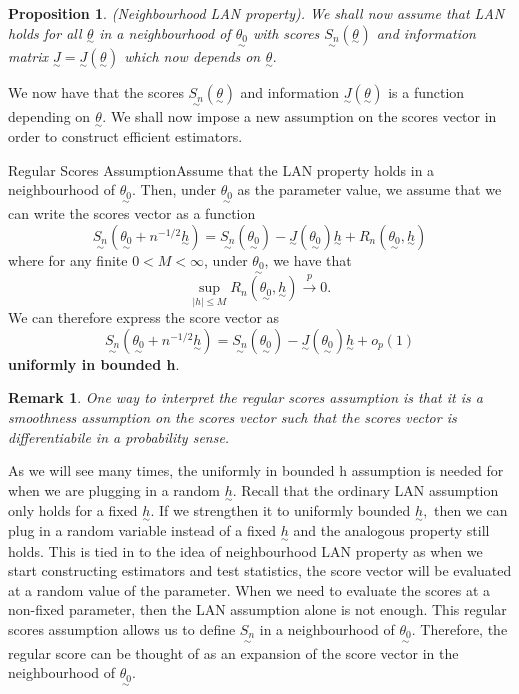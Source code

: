 \documentclass[twoside]{article}
\newtheorem{proposition}[theorem]{Proposition}
\newtheorem{remark}[theorem]{Remark}
\newcommand{\utilde}{\underset{\sim}}
\begin{document}
\begin{proposition}(Neighbourhood LAN property). We shall now assume that LAN holds for all $\utilde{\theta}$ in a neighbourhood of $\utilde{\theta_0}$ with scores $\utilde{S_n}(\utilde{\theta})$ and information matrix $\utilde{J} = \utilde{J}(\utilde{\theta})$ which now depends on $\utilde{\theta}.$
\end{proposition}

We now have that the scores $\utilde{S_n}(\utilde{\theta})$ and information $\utilde{J}(\utilde{\theta})$ is a function depending on $\utilde{\theta}.$ We shall now impose a new assumption on the scores vector in order to construct efficient estimators.

\begin{definition_exam}{Regular Scores Assumption}{}Assume that the LAN property holds in a neighbourhood of $\utilde{\theta_0}$. Then, under $\utilde{\theta_0}$ as the parameter value, we assume that we can write the scores vector as a function  $$\utilde{S_n}(\utilde{\theta_0} + n^{-1/2}\utilde{h}) = \utilde{S_n}(\utilde{\theta_0}) - \utilde{J}(\utilde{\theta_0})\utilde{h} + R_n(\utilde{\theta_0},\utilde{h})$$ where for any finite $0 < M < \infty$, under $\utilde{\theta_0}$, we have that
$$
\sup_{|h| \leq M}R_n(\utilde{\theta_0},\utilde{h}) \xrightarrow{p}0.
$$
We can therefore express the score vector as
$$\utilde{S_n}(\utilde{\theta_0} + n^{-1/2}\utilde{h}) = \utilde{S_n}(\utilde{\theta_0}) - \utilde{J}(\utilde{\theta_0})\utilde{h} + o_p(1)
$$
\textbf{uniformly in bounded h}.
\end{definition_exam}

\begin{remark}One way to interpret the regular scores assumption is that it is a smoothness assumption on the scores vector such that the scores vector is differentiabile in a probability sense.
\end{remark}

As we will see many times, the uniformly in bounded h assumption is needed for when we are plugging in a random $\utilde{h}.$ Recall that the ordinary LAN assumption only holds for a fixed $\utilde{h}.$ If we strengthen it to uniformly bounded $\utilde{h},$ then we can plug in a random variable instead of a fixed $\utilde{h}$ and the analogous property still holds. This is tied in to the idea of neighbourhood LAN property as when we start constructing estimators and test statistics, the score vector will be evaluated at a random value of the parameter. When we need to evaluate the scores at a non-fixed parameter, then the LAN assumption alone is not enough. This regular scores assumption allows us to define $\utilde{S_n}$ in a neighbourhood of $\utilde{\theta_0}.$ Therefore, the regular score can be thought of as an expansion of the score vector in the neighbourhood of $\utilde{\theta_0}.$
\end{document}
